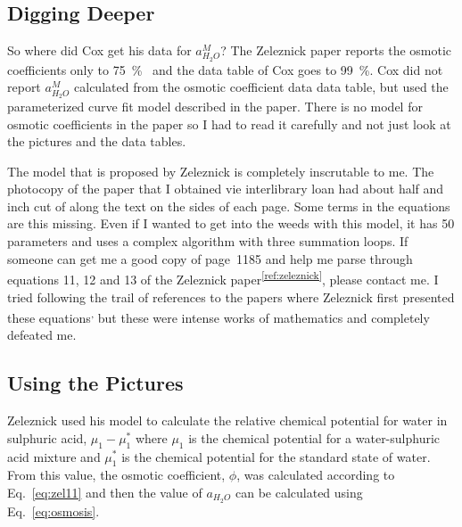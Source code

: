 \documentclass[]{tufte-handout}
\newcommand{\tss}[1]{\textsuperscript{#1}}
\begin{document}
\subsection{Digging Deeper}
So where did Cox get his data for $a_{H_2O}^M$? The Zeleznick paper reports the osmotic coefficients only to \qty{75}{\percent{}} and the data table of Cox goes to \qty{99}{\percent}. Cox did not report $a_{H_2O}^M$ calculated from the osmotic coefficient data data table, but used the parameterized curve fit model described in the paper. There is no model for osmotic coefficients in the paper so I had to read it carefully and not just look at the pictures and the data tables.

The model that is proposed by Zeleznick is completely inscrutable to me. The photocopy of the paper that I obtained vie interlibrary loan had about half and inch cut of along the text on the sides of each page. Some terms in the equations are this missing. Even if I wanted to get into the weeds with this model, it has 50 parameters and uses a complex algorithm with three summation loops. If someone can get me a good copy of page~1185 and help me parse through equations 11, 12 and 13 of the Zeleznick paper\tss{\ref{ref:zeleznick}}, please contact me. I tried following the trail of references to the papers where Zeleznick first presented these equations\tss{,}
 but these were intense works of mathematics and completely defeated me.
 
\subsection{Using the Pictures} 

Zeleznick used his model to calculate the relative chemical potential for water in sulphuric acid, $\mu_1 - \mu_1^*$ where $\mu_1$ is the chemical potential for a water-sulphuric acid mixture and $\mu_1^*$ is the chemical potential for the standard state of water. From this value, the osmotic coefficient, $\phi$, was calculated according to Eq.~\vref{eq:zel11} and then the value of $a_{H_2O}$ can be calculated using Eq.~\vref{eq:osmosis}.
\end{document}
